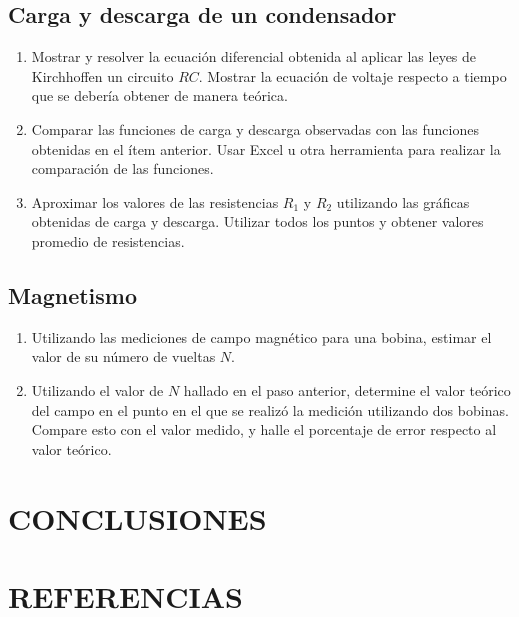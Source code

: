 \documentclass[10pt, twoside]{article}
\begin{document}
\subsection{Carga y descarga de un condensador}
\begin{enumerate}[label=\roman*.]
	\item Mostrar y resolver la ecuación diferencial obtenida al aplicar las leyes de Kirchhoffen un circuito $RC$.
		Mostrar la ecuación de voltaje respecto a tiempo que se debería obtener de manera teórica.
	\item Comparar las funciones de carga y descarga observadas con las funciones obtenidas en el ítem anterior.
		Usar Excel u otra herramienta para realizar la comparación de  las funciones.
	\item Aproximar los valores de las resistencias $R_1$ y $R_2$ utilizando las gráficas obtenidas de carga y descarga.
		Utilizar todos los puntos y obtener valores promedio de resistencias.
\end{enumerate}
\subsection{Magnetismo}
\begin{enumerate}[label=\roman*.]
	\item Utilizando las mediciones de campo magnético para una bobina,
		estimar el valor de su número de vueltas $N$.
	\item Utilizando el valor de $N$ hallado en el paso anterior,
		determine el valor teórico del campo en el punto en el que se realizó la medición utilizando dos bobinas.
		Compare esto con el valor medido, y halle el porcentaje de error respecto al valor teórico.
\end{enumerate}
\section{CONCLUSIONES}
\section{REFERENCIAS}
\end{document}
